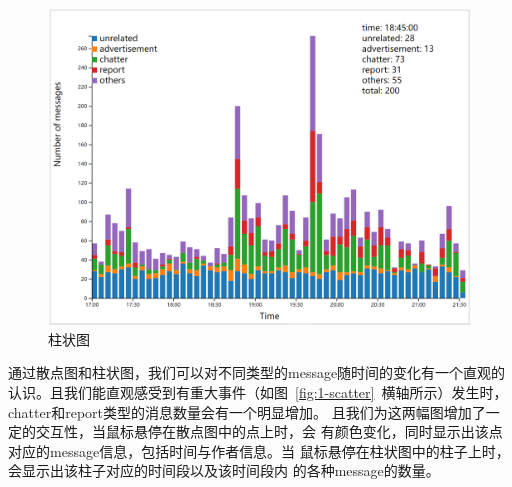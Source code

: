 \documentclass[a4paper]{article}
\begin{document}
\begin{figure}[H]
  \centering
  \includegraphics[width=1\textwidth]{images/1-bars-2.png}
  \caption{柱状图}\label{fig:1-bar}
  \vspace{\baselineskip}
\end{figure}
通过散点图和柱状图，我们可以对不同类型的message随时间的变化有一个直观的认识。且我们能直观感受到有重大事件（如图~\ref{fig:1-scatter}~横轴所示）发生时，
chatter和report类型的消息数量会有一个明显增加。
且我们为这两幅图增加了一定的交互性，当鼠标悬停在散点图中的点上时，会
有颜色变化，同时显示出该点对应的message信息，包括时间与作者信息。当
鼠标悬停在柱状图中的柱子上时，会显示出该柱子对应的时间段以及该时间段内
的各种message的数量。
\end{document}
